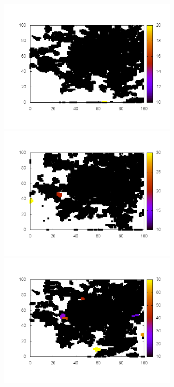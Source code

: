 \documentclass[10pt,a4paper]{article}
\begin{document}
\begin{figure}
\begin{subfigure}[b]{1\textwidth}
\includegraphics[scale=.3]{./img/stampe/scc1/12.png}
\includegraphics[scale=.3]{./img/stampe/scc1/13.png}
\includegraphics[scale=.3]{./img/stampe/scc1/14.png}

\end{subfigure}
\end{figure}
\end{document}
